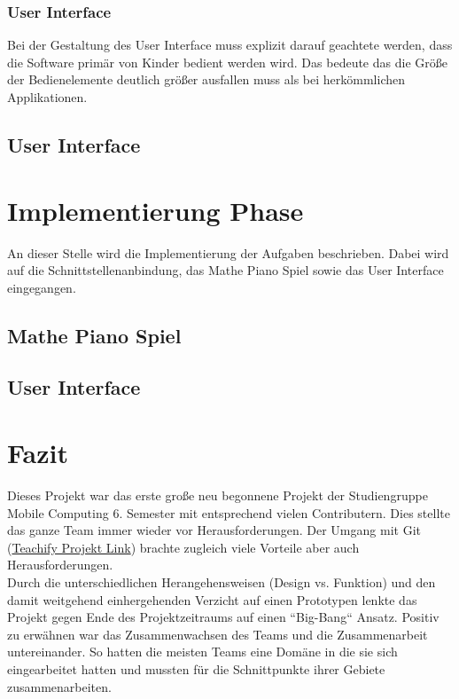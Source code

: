 \subsubsection{User Interface}
Bei der Gestaltung des User Interface muss explizit darauf geachtete werden, dass die Software primär von Kinder bedient werden wird. Das bedeute das die Größe der Bedienelemente deutlich größer ausfallen muss als bei herkömmlichen Applikationen.   

\subsection{User Interface}

\section{Implementierung Phase}
An dieser Stelle wird die Implementierung der Aufgaben beschrieben. Dabei wird auf die Schnittstellenanbindung, das Mathe Piano Spiel sowie das User Interface eingegangen.
\subsection{Mathe Piano Spiel}


\subsection{User Interface}

\section{Fazit}
Dieses Projekt war das erste große neu begonnene Projekt der Studiengruppe Mobile Computing 6. Semester mit entsprechend vielen Contributern. Dies stellte das ganze Team immer wieder vor Herausforderungen. Der Umgang mit Git (\href{https://github.com/cpfeiffer3008/Teachify}{Teachify Projekt Link}) brachte zugleich viele Vorteile aber auch Herausforderungen.\\
Durch die unterschiedlichen Herangehensweisen (Design vs. Funktion) und den damit weitgehend einhergehenden Verzicht auf einen Prototypen lenkte das Projekt gegen Ende des Projektzeitraums auf einen ``Big-Bang`` Ansatz.
Positiv zu erwähnen war das Zusammenwachsen des Teams und die Zusammenarbeit untereinander. So hatten die meisten Teams eine Domäne in die sie sich eingearbeitet hatten und mussten für die Schnittpunkte ihrer Gebiete zusammenarbeiten.